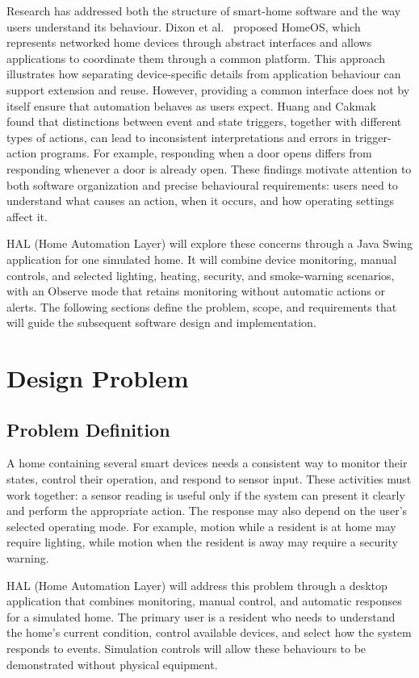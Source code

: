 \documentclass[12pt,letterpaper]{report}
\begin{document}
Research has addressed both the structure of smart-home software and the way users understand its behaviour. Dixon et al.~\cite{dixon2012an} proposed HomeOS, which represents networked home devices through abstract interfaces and allows applications to coordinate them through a common platform. This approach illustrates how separating device-specific details from application behaviour can support extension and reuse. However, providing a common interface does not by itself ensure that automation behaves as users expect. Huang and Cakmak~\cite{huang2015ubicomp} found that distinctions between event and state triggers, together with different types of actions, can lead to inconsistent interpretations and errors in trigger-action programs. For example, responding when a door opens differs from responding whenever a door is already open. These findings motivate attention to both software organization and precise behavioural requirements: users need to understand what causes an action, when it occurs, and how operating settings affect it.

HAL (Home Automation Layer) will explore these concerns through a Java Swing application for one simulated home. It will combine device monitoring, manual controls, and selected lighting, heating, security, and smoke-warning scenarios, with an Observe mode that retains monitoring without automatic actions or alerts. The following sections define the problem, scope, and requirements that will guide the subsequent software design and implementation.

\chapter{Design Problem}

\section{Problem Definition}
A home containing several smart devices needs a consistent way to monitor their states, control their operation, and respond to sensor input. These activities must work together: a sensor reading is useful only if the system can present it clearly and perform the appropriate action. The response may also depend on the user's selected operating mode. For example, motion while a resident is at home may require lighting, while motion when the resident is away may require a security warning.

HAL (Home Automation Layer) will address this problem through a desktop application that combines monitoring, manual control, and automatic responses for a simulated home. The primary user is a resident who needs to understand the home's current condition, control available devices, and select how the system responds to events. Simulation controls will allow these behaviours to be demonstrated without physical equipment.
\end{document}

